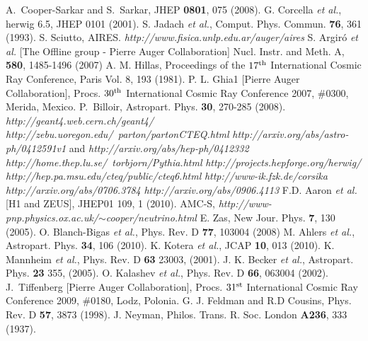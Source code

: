 \begin{thebibliography}{1}
 A.~Cooper-Sarkar and S.~Sarkar, JHEP {\bf 0801}, 075 (2008).
 G. Corcella {\it et al.}, {\sc herwig} 6.5, JHEP 0101 (2001).
 S. Jadach {\it et al.}, Comput. Phys. Commun. {\bf 76}, 361 (1993).
 S. Sciutto, AIRES. \emph{http://www.fisica.unlp.edu.ar/auger/aires}
 S. Argiró {\it et al.} [The Offline group - Pierre Auger Collaboration] Nucl. Instr. and Meth. A, {\bf 580}, 1485-1496 (2007)
 A. M. Hillas, Proceedings of the $17^{\rm th}$ International Cosmic Ray Conference, Paris Vol. 8, 193 (1981).
 P. L. Ghia1 [Pierre Auger Collaboration], Procs. $30^{\rm th}$ International Cosmic Ray Conference 2007, $\#$0300, Merida, Mexico.
 P.~Billoir, Astropart. Phys. {\bf 30}, 270-285 (2008).
 \emph{http://geant4.web.cern.ch/geant4/}
 \emph{http://zebu.uoregon.edu/~parton/partonCTEQ.html}
 \emph{http://arxiv.org/abs/astro-ph/0412591v1} and \emph{http://arxiv.org/abs/hep-ph/0412332}
 \emph{http://home.thep.lu.se/~torbjorn/Pythia.html}
 \emph{http://projects.hepforge.org/herwig/}
 \emph{http://hep.pa.msu.edu/cteq/public/cteq6.html}
 \emph{http://www-ik.fzk.de/corsika}
 \emph{http://arxiv.org/abs/0706.3784}
 \emph{http://arxiv.org/abs/0906.4113}
 F.D. Aaron {\it et al.} [H1 and ZEUS], JHEP01 109, 1 (2010).
 AMC-S, \emph{http://www-pnp.physics.ox.ac.uk/$\sim$cooper/neutrino.html}
 E. Zas, New Jour. Phys. \textbf{7}, 130 (2005).
 O. Blanch-Bigas {\it et al.}, Phys. Rev. D \textbf{77}, 103004 (2008)
 M. Ahlers {\it et al.}, Astropart. Phys. \textbf{34}, 106 (2010).
 K. Kotera {\it et al.}, JCAP \textbf{10}, 013 (2010).
 K. Mannheim {\it et al.}, Phys. Rev. D  \textbf{63} 23003, (2001).
  J. K. Becker {\it et al.}, Astropart. Phys. \textbf{23} 355, (2005).
 O. Kalashev {\it et al.}, Phys. Rev. D \textbf{66}, 063004 (2002).
 J.~Tiffenberg [Pierre Auger Collaboration], Procs. $31^{\rm st}$ International Cosmic Ray Conference 2009, $\#$0180, Lodz, Polonia.
 G. J. Feldman and R.D Cousins, Phys. Rev. D \textbf{57}, 3873 (1998).
 J. Neyman, Philos. Trans. R. Soc. London \textbf{A236}, 333 (1937).

\end{thebibliography}
